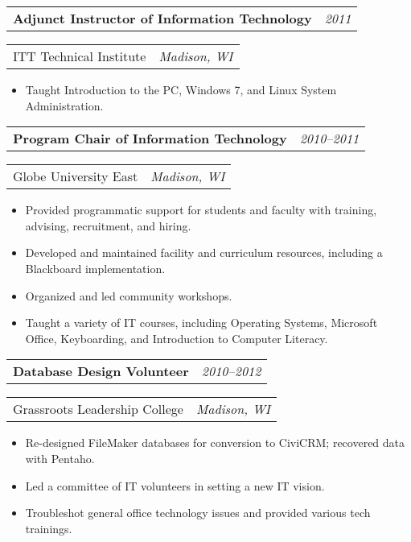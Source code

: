 \documentclass[letterpaper,11pt]{article}
\newcommand{\resitem}[1]{\item #1 \vspace{-8pt}}
\newcommand{\ressubheading}[4]{\vspace{4pt}
	\begin{tabularx}{\textwidth}{X r}
		\textbf{#1} & \textit{#4}
	\end{tabularx}

	\begin{tabularx}{\textwidth}{X r}
		#2 & \textit{#3}
	\end{tabularx}\vspace{-6pt}
	
}
\begin{document}
	\ressubheading{Adjunct Instructor of Information Technology}{ITT Technical Institute}{Madison, WI}{2011}
	\begin{itemize}
		\resitem{Taught Introduction to the PC, Windows 7, and Linux System Administration.}
	\end{itemize}

	\ressubheading{Program Chair of Information Technology}{Globe University East}{Madison, WI}{2010--2011}
	\begin{itemize}
		\resitem{Provided programmatic support for students and faculty with training, advising, recruitment, and hiring.}
		\resitem{Developed and maintained facility and curriculum resources, including a Blackboard implementation.}
		\resitem{Organized and led community workshops.}
		\resitem{Taught a variety of IT courses, including Operating Systems, Microsoft Office, Keyboarding, and Introduction to Computer Literacy.}
	\end{itemize}

	\ressubheading{Database Design Volunteer}{Grassroots Leadership College}{Madison, WI}{2010--2012}
	\begin{itemize}
		\resitem{Re-designed FileMaker databases for conversion to CiviCRM; recovered data with Pentaho.}
		\resitem{Led a committee of IT volunteers in setting a new IT vision.}
		\resitem{Troubleshot general office technology issues and provided various tech trainings.}
	\end{itemize}
\end{document}
